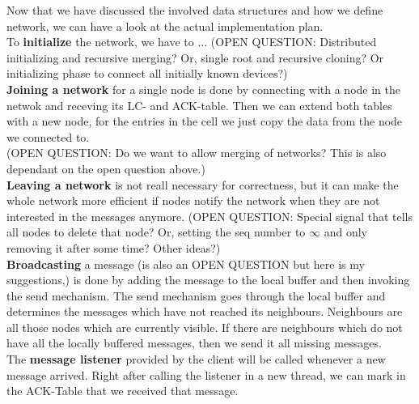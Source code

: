 Now that we have discussed the involved data structures and how we define network, we can have a look at the actual implementation plan. \\
To \textbf{initialize} the network, we have to $\ldots$ (OPEN QUESTION: Distributed initializing and recursive merging? Or, single root and recursive cloning? Or initializing phase to connect all initially known devices?) \\
\textbf{Joining a network} for a single node is done by connecting with a node in the netwok and receving its LC- and ACK-table. Then we can extend both tables with a new node, for the entries in the cell we just copy the data from the node we connected to. \\ 
(OPEN QUESTION: Do we want to allow merging of networks? This is also dependant on the open question above.) \\
\textbf{Leaving a network} is not reall necessary for correctness, but it can make the whole network more efficient if nodes notify the network when they are not interested in the messages anymore. (OPEN QUESTION: Special signal that tells all nodes to delete that node? Or, setting the seq number to $\infty$ and only removing it after some time? Other ideas?)\\
\textbf{Broadcasting} a message (is also an OPEN QUESTION but here is my suggestions,) is done by adding the message to the local buffer and then invoking the send mechanism. The send mechanism goes through the local buffer and determines the messages which have not reached its neighbours. Neighbours are all those nodes which are currently visible. If there are neighbours which do not have all the locally buffered messages, then we send it all missing messages.\\
The \textbf{message listener} provided by the client will be called whenever a new message arrived. Right after calling the listener in a new thread, we can mark in the ACK-Table that we received that message.  \\


			
		

